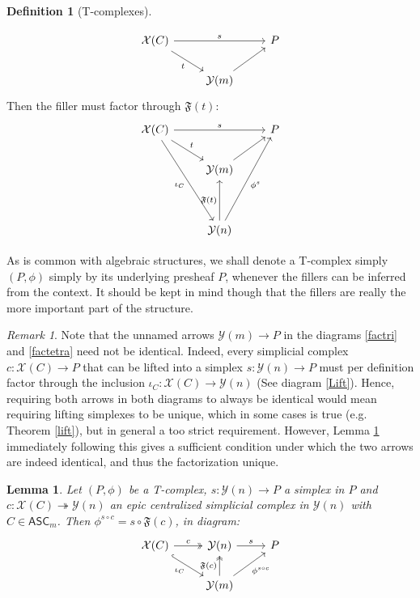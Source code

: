 \documentclass{article}
\newtheorem{lemma}{Lemma}[subsection]
\theoremstyle{remark}
\newtheorem{remark}{Remark}[subsection]
\theoremstyle{definition}
\newtheorem{definition}{Definition}[subsection]
\newcommand{\ASC}{\mathsf{ASC}}
\newcommand{\Y}{\mathcal Y}
\newcommand{\X}{\mathcal X}
\newcommand{\F}{\mathfrak F}
\begin{document}
\begin{definition}[T-complexes]
\begin{enumerate}
			\begin{equation}\label{factri}
				\begin{tikzcd}
					\X(C)\arrow{rr}{s}\arrow{dr}[swap]{t}&&P\\
					&\Y(m)\arrow{ur}
				\end{tikzcd}
			\end{equation}
			Then the filler must factor through $\F(t)$:
			\begin{equation}\label{factetra}
				\begin{tikzcd}
					\X(C)\arrow{rr}{s}\arrow{dr}{t}\arrow{dddr}[swap]{\iota_C}&&P\\
					&\Y(m)\arrow{ur}\\\\
					&\Y(n)\arrow{uu}{\F(t)}\arrow{uuur}[swap]{\phi^s}
				\end{tikzcd}
			\end{equation}
		\end{enumerate}
		As is common with algebraic structures, we shall denote a T-complex simply $(P,\phi)$ simply by its underlying presheaf $P$, whenever the fillers can be inferred from the context. It should be kept in mind though that the fillers are really the more important part of the structure.
	\end{definition}
	\begin{remark}
		Note that the unnamed arrows $\Y(m)\to P$ in the diagrams \ref{factri} and \ref{factetra} need not be identical. Indeed, every simplicial complex $c:\X(C)\to P$ that can be lifted into a simplex $s:\Y(n)\to P$ must per definition factor through the inclusion $\iota_C:\X(C)\to\Y(n)$ (See diagram \ref{Lift}). Hence, requiring both arrows in both diagrams to always be identical would mean requiring lifting simplexes to be unique, which in some cases is true (e.g. Theorem \ref{lift}), but in general a too strict requirement. However, Lemma \ref{unifac} immediately following this gives a sufficient condition under which the two arrows are indeed identical, and thus the factorization unique.
	\end{remark}
	\begin{lemma}\label{unifac}
		Let $(P,\phi)$ be a T-complex, $s:\Y(n)\to P$ a simplex in $P$ and $c:\X(C)\twoheadrightarrow\Y(n)$ an epic centralized simplicial complex in $\Y(n)$ with $C\in\ASC_m$. Then $\phi^{s\circ c}=s\circ\F(c)$, in diagram:
		\begin{equation}\label{epifac}
			\begin{tikzcd}
				\X(C)\arrow[two heads]{r}{c}\arrow[hook]{dr}[swap]{\iota_C}&\Y(n)\arrow{r}{s}&P\\
				&\Y(m)\arrow[two heads]{u}{\F(c)}\arrow{ur}[swap]{\phi^{s\circ c}}
			\end{tikzcd}
		\end{equation}
	\end{lemma}
\end{document}
